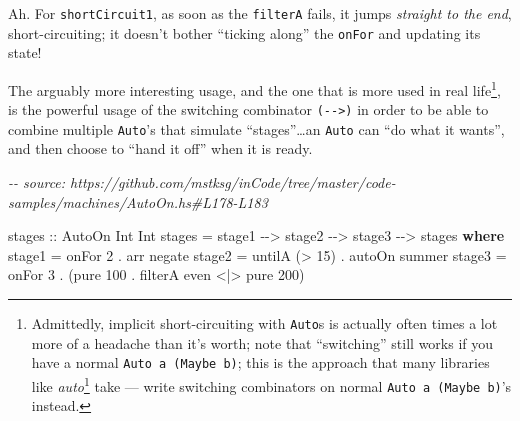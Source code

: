 \documentclass[]{article}
\newenvironment{Shaded}{}{}
\newcommand{\CommentTok}[1]{\textcolor[rgb]{0.38,0.63,0.69}{\textit{#1}}}
\newcommand{\DataTypeTok}[1]{\textcolor[rgb]{0.56,0.13,0.00}{#1}}
\newcommand{\DecValTok}[1]{\textcolor[rgb]{0.25,0.63,0.44}{#1}}
\newcommand{\FunctionTok}[1]{\textcolor[rgb]{0.02,0.16,0.49}{#1}}
\newcommand{\KeywordTok}[1]{\textcolor[rgb]{0.00,0.44,0.13}{\textbf{#1}}}
\newcommand{\NormalTok}[1]{#1}
\newcommand{\OperatorTok}[1]{\textcolor[rgb]{0.40,0.40,0.40}{#1}}
\newcommand{\OtherTok}[1]{\textcolor[rgb]{0.00,0.44,0.13}{#1}}
\renewcommand{\href}[2]{#2\footnote{\url{#1}}}
\begin{document}
Ah. For \texttt{shortCircuit1}, as soon as the \texttt{filterA} fails, it jumps
\emph{straight to the end}, short-circuiting; it doesn't bother ``ticking
along'' the \texttt{onFor} and updating its state!

The arguably more interesting usage, and the one that is more used in real
life\footnote{Admittedly, implicit short-circuiting with \texttt{Auto}s is
  actually often times a lot more of a headache than it's worth; note that
  ``switching'' still works if you have a normal \texttt{Auto\ a\ (Maybe\ b)};
  this is the approach that many libraries like
  \href{https://github.com/mstksg/auto.}{\emph{auto}} take --- write switching
  combinators on normal \texttt{Auto\ a\ (Maybe\ b)}'s instead.}, is the
powerful usage of the switching combinator \texttt{(-\/-\textgreater{})} in
order to be able to combine multiple \texttt{Auto}'s that simulate
``stages''\ldots an \texttt{Auto} can ``do what it wants'', and then choose to
``hand it off'' when it is ready.

\begin{Shaded}
\begin{Highlighting}[]
\CommentTok{{-}{-} source: https://github.com/mstksg/inCode/tree/master/code{-}samples/machines/AutoOn.hs\#L178{-}L183}

\OtherTok{stages ::} \DataTypeTok{AutoOn} \DataTypeTok{Int} \DataTypeTok{Int}
\NormalTok{stages }\OtherTok{=}\NormalTok{ stage1 }\OperatorTok{{-}{-}>}\NormalTok{ stage2 }\OperatorTok{{-}{-}>}\NormalTok{ stage3 }\OperatorTok{{-}{-}>}\NormalTok{ stages}
  \KeywordTok{where}
\NormalTok{    stage1 }\OtherTok{=}\NormalTok{ onFor }\DecValTok{2} \OperatorTok{.}\NormalTok{ arr }\FunctionTok{negate}
\NormalTok{    stage2 }\OtherTok{=}\NormalTok{ untilA (}\OperatorTok{>} \DecValTok{15}\NormalTok{) }\OperatorTok{.}\NormalTok{ autoOn summer}
\NormalTok{    stage3 }\OtherTok{=}\NormalTok{ onFor }\DecValTok{3} \OperatorTok{.}\NormalTok{ (}\FunctionTok{pure} \DecValTok{100} \OperatorTok{.}\NormalTok{ filterA }\FunctionTok{even} \OperatorTok{<|>} \FunctionTok{pure} \DecValTok{200}\NormalTok{)}
\end{Highlighting}
\end{Shaded}
\end{document}

